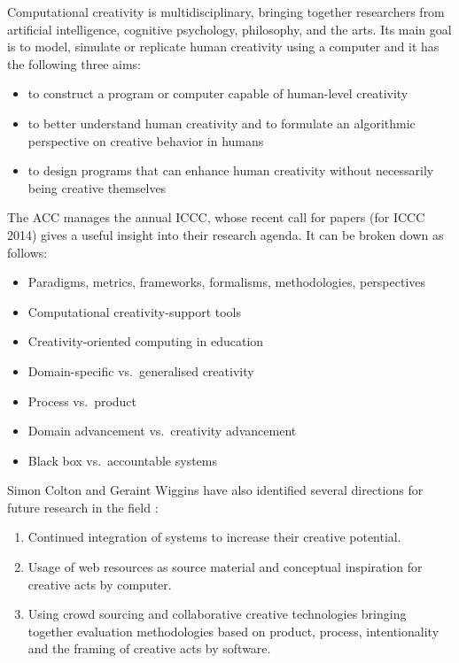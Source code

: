 Computational creativity is multidisciplinary, bringing together researchers from artificial intelligence, cognitive psychology, philosophy, and the arts.  Its main goal is to model, simulate or replicate human creativity using a computer and it has the following three aims:

\begin{itemize}
  \item to construct a program or computer capable of human-level creativity
  \item to better understand human creativity and to formulate an algorithmic perspective on creative behavior in humans
  \item to design programs that can enhance human creativity without necessarily being creative themselves
\end{itemize}

The \acf{ACC} manages the annual \ac{ICCC}, whose recent call for papers (for \ac{ICCC} 2014) gives a useful insight into their research agenda. It can be broken down as follows:

\begin{itemize}
  \item Paradigms, metrics, frameworks, formalisms, methodologies, perspectives
  \item Computational creativity-support tools
  \item Creativity-oriented computing in education
  \item Domain-specific vs.\ generalised creativity
  \item Process vs.\ product
  \item Domain advancement vs.\ creativity advancement
  \item Black box vs.\ accountable systems
\end{itemize}

Simon Colton and Geraint Wiggins have also identified several directions for future research in the field \autocite*{Colton2012}:

\begin{enumerate}
  \item Continued integration of systems to increase their creative potential.
  \item Usage of web resources as source material and conceptual inspiration for creative acts by computer.
  \item Using crowd sourcing and collaborative creative technologies bringing together evaluation methodologies based on product, process, intentionality and the framing of creative acts by software.
\end{enumerate}


